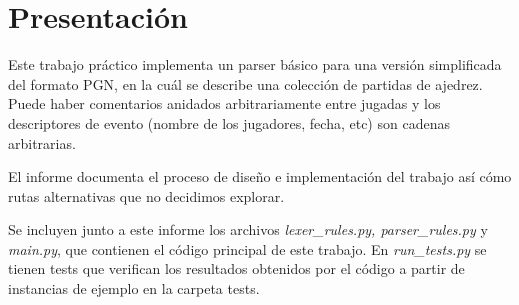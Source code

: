 \section{Presentación}

Este trabajo práctico implementa un parser básico para una versión simplificada del formato PGN, en la cuál se describe una colección de partidas de ajedrez. Puede haber comentarios anidados arbitrariamente entre jugadas y los descriptores de evento (nombre de los jugadores, fecha, etc) son cadenas arbitrarias.

El informe documenta el proceso de diseño e implementación del trabajo así cómo rutas alternativas que no decidimos explorar.

Se incluyen junto a este informe los archivos \textit{lexer\_rules.py, parser\_rules.py} y \textit{main.py}, que contienen el código principal de este trabajo. En \textit{run\_tests.py} se tienen tests que verifican los resultados obtenidos por el código a partir de instancias de ejemplo en la carpeta tests.